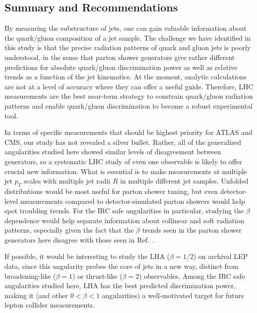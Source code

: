 \documentclass[11pt]{cernrep}
\begin{document}
\subsection{Summary and Recommendations}
\label{quarkgluon_sec:conclude}

By measuring the substructure of jets, one can gain valuable information about the quark/gluon composition of a jet sample.  The challenge we have identified in this study is that the precise radiation patterns of quark and gluon jets is poorly understood, in the sense that parton shower generators give rather different predictions for absolute quark/gluon discrimination power as well as relative trends as a function of the jet kinematics.  At the moment, analytic calculations are not at a level of accuracy where they can offer a useful guide.  Therefore, LHC measurements are the best near-term strategy to constrain quark/gluon radiation patterns and enable quark/gluon discrimination to become a robust experimental tool.

In terms of specific measurements that should be highest priority for ATLAS and CMS, our study has not revealed a silver bullet.  Rather, all of the generalized angularities studied here showed similar levels of disagreement between generators, so a systematic LHC study of even one observable is likely to offer crucial new information.  What is essential is to make measurements at multiple jet $p_T$ scales with multiple jet radii $R$ in multiple different jet samples.  Unfolded distributions would be most useful for parton shower tuning, but even detector-level measurements compared to detector-simulated parton showers would help spot troubling trends.  For the IRC safe angularities in particular, studying the $\beta$ dependence would help separate information about collinear and soft radiation patterns, especially given the fact that the $\beta$ trends seen in the parton shower generators here disagree with those seen in Ref.~\cite{Aad:2014gea}.

If possible, it would be interesting to study the LHA ($\beta = 1/2$) on archival LEP data, since this angularity probes the core of jets in a new way, distinct from broadening-like ($\beta = 1$) or thrust-like ($\beta = 2$) observables.  Among the IRC safe angularities studied here, LHA has the best predicted discrimination power, making it (and other $0<\beta < 1$ angularities) a well-motivated target for future lepton collider measurements.
\end{document}
